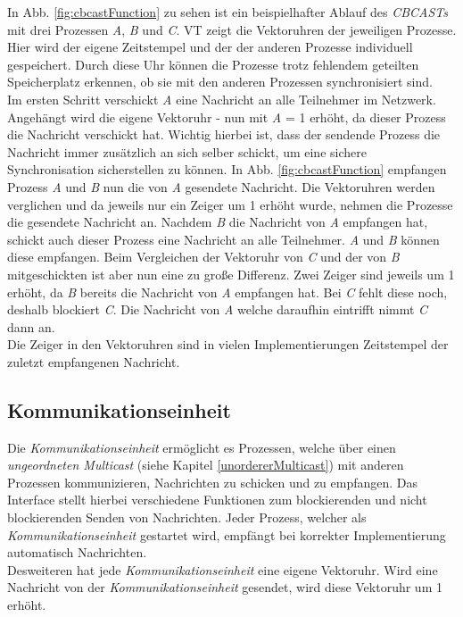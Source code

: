 In Abb. \ref{fig:cbcastFunction} zu sehen ist ein beispielhafter Ablauf des \textit{CBCASTs} mit drei Prozessen \textit{A}, \textit{B} und \textit{C}. VT zeigt die Vektoruhren der jeweiligen Prozesse. Hier wird der eigene Zeitstempel und der der anderen Prozesse individuell gespeichert. Durch diese Uhr können die Prozesse trotz fehlendem geteilten Speicherplatz erkennen, ob sie mit den anderen Prozessen synchronisiert sind.\\
Im ersten Schritt verschickt \textit{A} eine Nachricht an alle Teilnehmer im Netzwerk. Angehängt wird die eigene Vektoruhr - nun mit \textit{A} = 1 erhöht, da dieser Prozess die Nachricht verschickt hat. Wichtig hierbei ist, dass der sendende Prozess die Nachricht immer zusätzlich an sich selber schickt, um eine sichere Synchronisation sicherstellen zu können. In Abb. \ref{fig:cbcastFunction} empfangen Prozess \textit{A} und \textit{B} nun die von \textit{A} gesendete Nachricht. Die Vektoruhren werden verglichen und da jeweils nur ein Zeiger um 1 erhöht wurde, nehmen die Prozesse die gesendete Nachricht an. Nachdem \textit{B} die Nachricht von \textit{A} empfangen hat, schickt auch dieser Prozess eine Nachricht an alle Teilnehmer. \textit{A} und \textit{B} können diese empfangen. Beim Vergleichen der Vektoruhr von \textit{C} und der von \textit{B} mitgeschickten ist aber nun eine zu große Differenz. Zwei Zeiger sind jeweils um 1 erhöht, da \textit{B} bereits die Nachricht von \textit{A} empfangen hat. Bei \textit{C} fehlt diese noch, deshalb blockiert \textit{C}. Die Nachricht von \textit{A} welche daraufhin eintrifft nimmt \textit{C} dann an.\\
Die Zeiger in den Vektoruhren sind in vielen Implementierungen Zeitstempel der zuletzt empfangenen Nachricht.\\

\subsection{Kommunikationseinheit}

Die \textit{Kommunikationseinheit} ermöglicht es Prozessen, welche über einen \textit{ungeordneten Multicast} (siehe Kapitel \ref{unordererMulticast}) mit anderen Prozessen kommunizieren, Nachrichten zu schicken und zu empfangen. Das Interface stellt hierbei verschiedene Funktionen zum blockierenden und nicht blockierenden Senden von Nachrichten. Jeder Prozess, welcher als \textit{Kommunikationseinheit} gestartet wird, empfängt bei korrekter Implementierung automatisch Nachrichten.\\
Desweiteren hat jede \textit{Kommunikationseinheit} eine eigene Vektoruhr. Wird eine Nachricht von der \textit{Kommunikationseinheit} gesendet, wird diese Vektoruhr um 1 erhöht.

